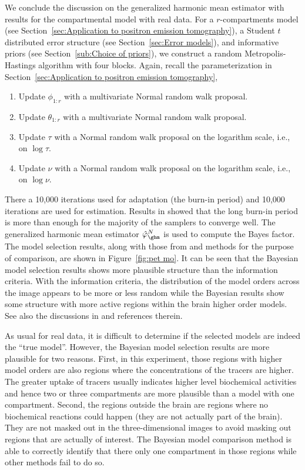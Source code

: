 We conclude the discussion on the generalized harmonic mean estimator with results for the \pet compartmental model with real data. For a $r$-compartments \pet model (see Section~\ref{sec:Application to positron emission tomography}), a Student $t$ distributed error structure (see Section~\ref{sec:Error models}), and informative priors (see Section~\ref{sub:Choice of priors}), we construct a random Metropolis-Hastings algorithm with four blocks. Again, recall the parameterization in Section~\ref{sec:Application to positron emission tomography},
\begin{enumerate}
  \item Update $\phi_{1:r}$ with a multivariate Normal random walk proposal.
  \item Update $\theta_{1:r}$ with a multivariate Normal random walk proposal.
  \item Update $\tau$ with a Normal random walk proposal on the logarithm
    scale, i.e., on $\log\tau$.
  \item Update $\nu$ with a Normal random walk proposal on the logarithm
    scale, i.e., on $\log\nu$.
\end{enumerate}
There  a 10,000 iterations used for adaptation (the burn-in period) and 10,000 iterations are used for estimation. Results in \cite{Zhou2013} showed that the long burn-in period is more than enough for the majority of the samplers to converge well. The generalized harmonic mean estimator $\hat\varphi_{\ghm}^N$ is used to compute the Bayes factor. The model selection results, along with those from \aic and \bic methods for the purpose of comparison, are shown in Figure~\ref{fig:pet mo}. It can be seen that the Bayesian model selection results shows more plausible structure than the information criteria. With the information criteria, the distribution of the model orders across the image appears to be more or less random while the Bayesian results show some structure with more active regions within the brain  higher order models. See also the discussions in \cite{Zhou2013} and references therein.

\begin{draftpar}
As usual for real data, it is difficult to determine if the selected models are indeed the ``true model''. However, the Bayesian model selection results are more plausible for two reasons. First, in this experiment, those regions with higher model orders are also regions where the concentrations of the tracers are higher. The greater uptake of tracers usually indicates higher level biochemical activities and hence  two or three compartments are more plausible than a model with one compartment. Second, the regions outside the brain are regions where no biochemical reactions could  happen (they are not actually part of the brain). They are not masked out in the three-dimensional images to avoid masking out regions that are actually of interest. The Bayesian model comparison method is able to correctly identify that there  only one compartment in those regions while other methods fail to do so.
\end{draftpar} 


